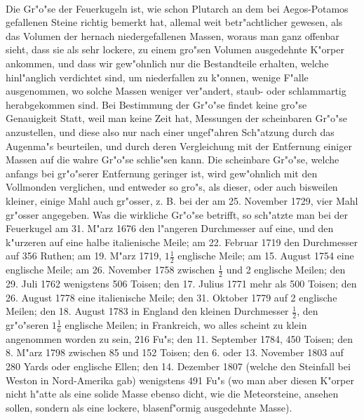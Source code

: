 \documentclass[a4paper, 11pt, oneside, polutonikogreek, german]{article}
\begin{document}
\paragraph{}
Die Gr"o"se der Feuerkugeln ist, wie schon Plutarch an dem bei Aegos-Potamos gefallenen Steine richtig bemerkt hat, allemal weit betr"achtlicher gewesen, als das Volumen der hernach niedergefallenen Massen, woraus man ganz offenbar sieht, dass sie als sehr lockere, zu einem gro"sen Volumen ausgedehnte K"orper ankommen, und dass wir gew"ohnlich nur die Bestandteile erhalten, welche hinl"anglich verdichtet sind, um niederfallen zu k"onnen, wenige F"alle ausgenommen, wo solche Massen weniger ver"andert, staub- oder schlammartig herabgekommen sind. Bei Bestimmung der Gr"o"se findet keine gro"se Genauigkeit Statt, weil man keine Zeit hat, Messungen der scheinbaren Gr"o"se anzustellen, und diese also nur nach einer ungef"ahren Sch"atzung durch das Augenma"s beurteilen, und durch deren Vergleichung mit der Entfernung einiger Massen auf die wahre Gr"o"se schlie"sen kann. Die scheinbare Gr"o"se, welche anfangs bei gr"o"serer Entfernung geringer ist, wird gew"ohnlich mit den Vollmonden verglichen, und entweder so gro"s, als dieser, oder auch bisweilen kleiner, einige Mahl auch gr"osser, z. B. bei der am 25. November 1729, vier Mahl gr"osser angegeben. Was die wirkliche Gr"o"se betrifft, so sch"atzte man bei der Feuerkugel am 31. M"arz 1676 den l"angeren Durchmesser auf eine, und den k"urzeren auf eine halbe italienische Meile; am 22. Februar 1719 den Durchmesser auf 356 Ruthen; am 19. M"arz 1719, $\mathfrak{1\frac{1}{2}}$ englische Meile; am 15. August 1754 eine englische Meile; am 26. November 1758 zwischen $\mathfrak{\frac{1}{2}}$ und 2 englische Meilen; den 29. Juli 1762 wenigstens 506 Toisen; den 17. Julius 1771 mehr als 500 Toisen; den 26. August 1778 eine italienische Meile; den 31. Oktober 1779 auf 2 englische Meilen; den 18. August 1783 in England den kleinen Durchmesser $\mathfrak{\frac{1}{2}}$, den gr"o"seren $\mathfrak{1\frac{1}{6}}$ englische Meilen; in Frankreich, wo alles scheint zu klein angenommen worden zu sein, 216 Fu"s; den 11. September 1784, 450 Toisen; den 8. M"arz 1798 zwischen 85 und 152 Toisen; den 6. oder 13. November 1803 auf 280 Yards oder englische Ellen; den 14. Dezember 1807 (welche den Steinfall bei Weston in Nord-Amerika gab) wenigstens 491 Fu"s (wo man aber diesen K"orper nicht h"atte als eine solide Masse ebenso dicht, wie die Meteorsteine, ansehen sollen, sondern als eine lockere, blasenf"ormig ausgedehnte Masse).
\subsection{}
\end{document}
